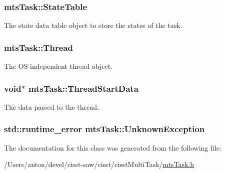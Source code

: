 \subsubsection[{State\+Table}]{ mts\+Task\+::\+State\+Table\hspace{0.3cm}{\ttfamily [protected]}}\label{classmts_task_afef3935273a3dfe792b7d3beb6b3c4f1}
The state data table object to store the states of the task. \hypertarget{classmts_task_a020aaf3f85e33991c3b349138b826218}{}
\subsubsection[{Thread}]{ mts\+Task\+::\+Thread\hspace{0.3cm}{\ttfamily [protected]}}\label{classmts_task_a020aaf3f85e33991c3b349138b826218}
The O\+S independent thread object. \hypertarget{classmts_task_a0f4d0bdac8ce91bd7a44a80d0903165b}{}
\subsubsection[{Thread\+Start\+Data}]{\setlength{\rightskip}{0pt plus 5cm}void$\ast$ mts\+Task\+::\+Thread\+Start\+Data\hspace{0.3cm}{\ttfamily [protected]}}\label{classmts_task_a0f4d0bdac8ce91bd7a44a80d0903165b}
The data passed to the thread. \hypertarget{classmts_task_a518652604363d9402292a67c1836e888}{}
\subsubsection[{Unknown\+Exception}]{\setlength{\rightskip}{0pt plus 5cm}std\+::runtime\+\_\+error mts\+Task\+::\+Unknown\+Exception\hspace{0.3cm}{\ttfamily [static]}}\label{classmts_task_a518652604363d9402292a67c1836e888}


The documentation for this class was generated from the following file\+:\begin{DoxyCompactItemize}
\item 
/\+Users/anton/devel/cisst-\/saw/cisst/cisst\+Multi\+Task/\hyperlink{mts_task_8h}{mts\+Task.\+h}\end{DoxyCompactItemize}
